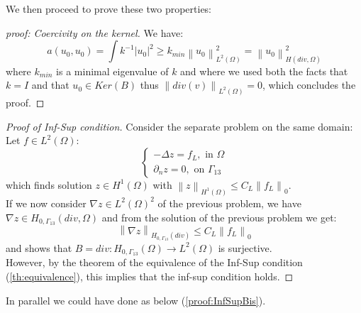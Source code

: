 \documentclass[conference]{IEEEtran}
\newcommand{\norm}[1]{\left\lVert#1\right\rVert}
\begin{document}
We then proceed to prove these two properties:
\begin{proof}[proof: Coercivity on the kernel]
We have: 
$$a(u_0,u_0)=\int k^{-1} |u_0|^2 \geq k_{min} \norm{u_0}^2_{L^2(\Omega)} = \norm{u_0}^2_{H(div,\Omega)}$$ 
where $k_{min}$ is a minimal eigenvalue of $k$ and where we used both the facts that $k=I$ and that $u_0 \in Ker(B)$ thus $\norm{div(v)}_{L^2(\Omega)}=0$, which concludes the proof.
\end{proof}

\begin{proof}[Proof of Inf-Sup condition]
Consider the separate problem on the same domain:\\
Let $f \in L^2(\Omega)$:
\begin{equation}
	\begin{cases}
		-\Delta z = f_L ,  \text{  in } \Omega \\
		\partial_n z = 0 , \text{  on } \Gamma_{13}
	\end{cases}
	\label{eq:laplacian}
\end{equation}
which finds solution $z \in H^1(\Omega)$ with $\norm{z}_{H^1(\Omega)} \leq C_L \norm{f_L}_0 $.\\
If we now consider $\nabla z \in L^2(\Omega)^2$ of the previous problem, we have $\nabla z \in H_{0,\Gamma_{13}}(div,\Omega)$ and from the solution of the previous problem we get:
\begin{equation}
	\norm{\nabla z}_{H_{0,\Gamma_{13}}(div)} \leq C_L \norm{f_L}_0
	\label{eq:laplacianContinuity}
\end{equation} 
and shows that $B=div: H_{0,\Gamma_{13}}(\Omega) \longrightarrow L^2(\Omega)$ is surjective. \\
However, by the theorem of the equivalence of the Inf-Sup condition (\ref{th:equivalence}), this implies that the inf-sup condition holds.
\end{proof}
In parallel we could have done as below (\ref{proof:InfSupBis}).
\end{document}
